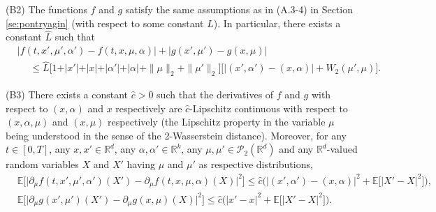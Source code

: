 \documentclass[11pt]{amsart}
\begin{document}
\vskip 2pt

(B2) The functions $f$ and $g$ satisfy the same assumptions as in (A.3-4) in Section \ref{se:pontryagin} (with respect to some constant $L$). In particular, there exists a constant $\hat{L}$ such that
\begin{equation*}
\begin{split}
&\bigl\vert f(t,x',\mu',\alpha') - f(t,x,\mu,\alpha) \bigr\vert + \bigl\vert g(x',\mu') - g(x,\mu) \bigr\vert
\\
&\hspace{15pt} \leq \hat{L} \bigl[ 1 + \vert x' \vert + \vert x \vert + \vert \alpha' \vert +
\vert \alpha \vert + \|  \mu  \|_{2} + \|\mu' \|_{2} \bigr] \bigl[ \vert (x',\alpha') - (x,\alpha) \vert +
W_{2}(\mu',\mu) \bigr].
\end{split}
\end{equation*} 

(B3)  There exists a constant $\hat{c}>0$ such that the derivatives of $f$ and $g$ 
with respect to $(x,\alpha)$ and $x$ respectively
are $\hat{c}$-Lipschitz continuous with respect to $(x,\alpha,\mu)$ and $(x,\mu)$ respectively
(the Lipschitz property in the variable $\mu$ being understood in the sense of the 2-Wasserstein distance). Moreover, for any
$t \in [0,T]$, any  
$x,x' \in {\mathbb R}^d$, any $\alpha,\alpha' \in {\mathbb R}^k$, any 
$\mu,\mu' \in {\mathcal P}_{2}({\mathbb R}^d)$ and 
any ${\mathbb R}^d$-valued random variables $X$ and $X'$ having $\mu$ and $\mu'$ as respective distributions, 
\begin{equation*}
\begin{split}
&{\mathbb E} \bigl[ \vert \partial_{\mu} f(t,x',\mu',\alpha')(X') - \partial_{\mu} f(t,x,\mu,\alpha)(X) \vert^2 \bigr]
\leq \hat{c} \bigl( \vert (x',\alpha') - (x,\alpha) \vert^2 +
{\mathbb E} \bigl[ \vert X'- X \vert^2\bigr] \bigr),
\\
 &{\mathbb E} \bigl[ \vert \partial_{\mu} g(x',\mu')(X') - \partial_{\mu} g(x,\mu)(X) \vert^2 \bigr] 
 \leq \hat{c} \bigl( \vert x'-x \vert^2 + {\mathbb E} \bigl[ \vert X'- X \vert^2 \bigr] \bigr). 
\end{split}
\end{equation*}
\vskip 2pt
\end{document}
